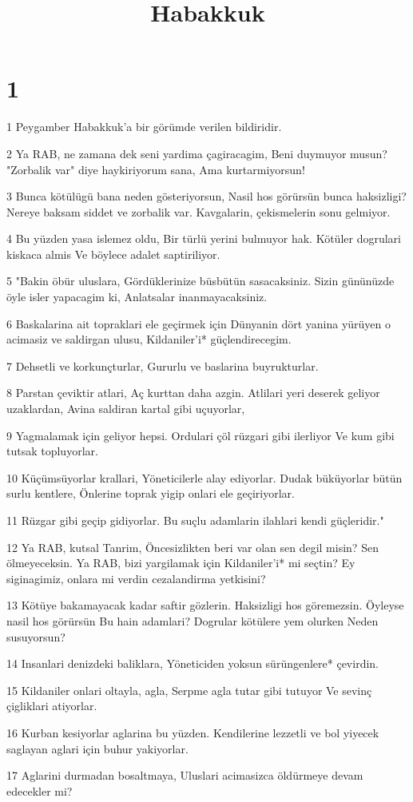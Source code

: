 

\title{Habakkuk}


\chapter{1}

\par 1 Peygamber Habakkuk'a bir görümde verilen bildiridir.
\par 2 Ya RAB, ne zamana dek seni yardima çagiracagim, Beni duymuyor musun? "Zorbalik var" diye haykiriyorum sana, Ama kurtarmiyorsun!
\par 3 Bunca kötülügü bana neden gösteriyorsun, Nasil hos görürsün bunca haksizligi? Nereye baksam siddet ve zorbalik var. Kavgalarin, çekismelerin sonu gelmiyor.
\par 4 Bu yüzden yasa islemez oldu, Bir türlü yerini bulmuyor hak. Kötüler dogrulari kiskaca almis Ve böylece adalet saptiriliyor.
\par 5 "Bakin öbür uluslara, Gördüklerinize büsbütün sasacaksiniz. Sizin gününüzde öyle isler yapacagim ki, Anlatsalar inanmayacaksiniz.
\par 6 Baskalarina ait topraklari ele geçirmek için Dünyanin dört yanina yürüyen o acimasiz ve saldirgan ulusu, Kildaniler'i* güçlendirecegim.
\par 7 Dehsetli ve korkunçturlar, Gururlu ve baslarina buyrukturlar.
\par 8 Parstan çeviktir atlari, Aç kurttan daha azgin. Atlilari yeri deserek geliyor uzaklardan, Avina saldiran kartal gibi uçuyorlar,
\par 9 Yagmalamak için geliyor hepsi. Ordulari çöl rüzgari gibi ilerliyor Ve kum gibi tutsak topluyorlar.
\par 10 Küçümsüyorlar krallari, Yöneticilerle alay ediyorlar. Dudak büküyorlar bütün surlu kentlere, Önlerine toprak yigip onlari ele geçiriyorlar.
\par 11 Rüzgar gibi geçip gidiyorlar. Bu suçlu adamlarin ilahlari kendi güçleridir."
\par 12 Ya RAB, kutsal Tanrim, Öncesizlikten beri var olan sen degil misin? Sen ölmeyeceksin. Ya RAB, bizi yargilamak için Kildaniler'i* mi seçtin? Ey siginagimiz, onlara mi verdin cezalandirma yetkisini?
\par 13 Kötüye bakamayacak kadar saftir gözlerin. Haksizligi hos göremezsin. Öyleyse nasil hos görürsün Bu hain adamlari? Dogrular kötülere yem olurken Neden susuyorsun?
\par 14 Insanlari denizdeki baliklara, Yöneticiden yoksun sürüngenlere* çevirdin.
\par 15 Kildaniler onlari oltayla, agla, Serpme agla tutar gibi tutuyor Ve sevinç çigliklari atiyorlar.
\par 16 Kurban kesiyorlar aglarina bu yüzden. Kendilerine lezzetli ve bol yiyecek saglayan aglari için buhur yakiyorlar.
\par 17 Aglarini durmadan bosaltmaya, Uluslari acimasizca öldürmeye devam edecekler mi?

